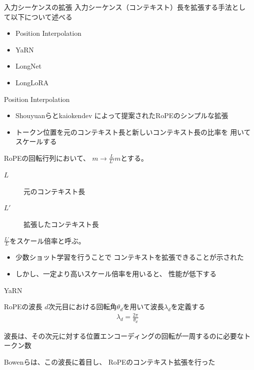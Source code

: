 \documentclass[dvipdfm, aspectratio=169]{beamer}
\begin{document}
    \begin{frame}{入力シーケンスの拡張}
        入力シーケンス（コンテキスト）長を拡張する手法として以下について述べる
        \begin{itemize}
            \item Position Interpolation
            \item YaRN
            \item LongNet
            \item LongLoRA
        \end{itemize}
    \end{frame}
    \begin{frame}{Position Interpolation}
        \begin{itemize}
            \item {Shouyuanらとkaiokendev
            によって提案されたRoPEのシンプルな拡張}
            \item{
                トークン位置を元のコンテキスト長と新しいコンテキスト長の比率を
                用いてスケールする
            }
        \end{itemize}

        \begin{block}{}
            RoPEの回転行列において、
            $m\rightarrow \frac{L}{L'}m$とする。
            \begin{description}
                \item[$L$] 元のコンテキスト長
                \item[$L'$] 拡張したコンテキスト長
            \end{description}
            $\frac{L'}{L}$をスケール倍率と呼ぶ。
        \end{block}

        \begin{itemize}
            \item{
                少数ショット学習を行うことで
                コンテキストを拡張できることが示された
            }
            \item{
                しかし、一定より高いスケール倍率を用いると、
                性能が低下する
            }
        \end{itemize}
    \end{frame}
    \begin{frame}{YaRN}
        \begin{block}{RoPEの波長}
            $d$次元目における回転角$\theta_d$を用いて波長$\lambda_d$を定義する
            \begin{align*}
                \lambda_d=\frac{2\pi}{\theta_d}
            \end{align*}

            波長は、その次元に対する位置エンコーディングの回転が一周するのに必要なトークン数
        \end{block}
        Bowenらは、この波長に着目し、
        RoPEのコンテキスト拡張を行った
    \end{frame}
\end{document}
